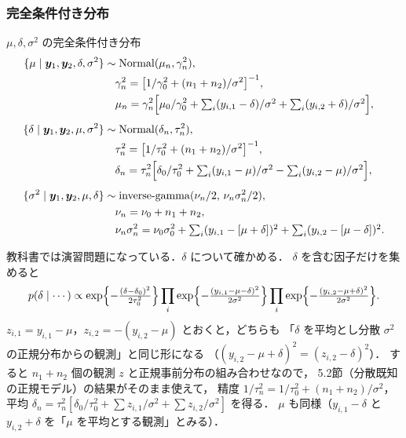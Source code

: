 \documentclass[lualatex,ja=standard,a4paper,12pt]{bxjsarticle}
\newcommand{\IG}{\mathrm{inverse\text{-}gamma}}
\begin{document}
\subsubsection*{完全条件付き分布}

\begin{thmbox}{$\mu, \delta, \sigma^2$ の完全条件付き分布}
\begin{align*}
  \{\mu \mid \bm{y}_1, \bm{y}_2, \delta, \sigma^2\} &\sim \mathrm{Normal}(\mu_n, \gamma_n^2), \\
  &\quad \gamma_n^2 = \bigl[1/\gamma_0^2 + (n_1+n_2)/\sigma^2\bigr]^{-1}, \\
  &\quad \mu_n = \gamma_n^2\Bigl[\mu_0/\gamma_0^2 + \textstyle\sum_i (y_{i,1} - \delta)/\sigma^2 + \sum_i (y_{i,2} + \delta)/\sigma^2\Bigr], \\[4pt]
  \{\delta \mid \bm{y}_1, \bm{y}_2, \mu, \sigma^2\} &\sim \mathrm{Normal}(\delta_n, \tau_n^2), \\
  &\quad \tau_n^2 = \bigl[1/\tau_0^2 + (n_1+n_2)/\sigma^2\bigr]^{-1}, \\
  &\quad \delta_n = \tau_n^2\Bigl[\delta_0/\tau_0^2 + \textstyle\sum_i (y_{i,1} - \mu)/\sigma^2 - \sum_i (y_{i,2} - \mu)/\sigma^2\Bigr], \\[4pt]
  \{\sigma^2 \mid \bm{y}_1, \bm{y}_2, \mu, \delta\} &\sim \IG(\nu_n/2,\, \nu_n\sigma_n^2/2), \\
  &\quad \nu_n = \nu_0 + n_1 + n_2, \\
  &\quad \nu_n\sigma_n^2 = \nu_0\sigma_0^2 + \textstyle\sum_i (y_{i,1} - [\mu + \delta])^2 + \sum_i (y_{i,2} - [\mu - \delta])^2.
\end{align*}
\end{thmbox}

\begin{derivbox}
教科書では演習問題になっている．$\delta$ について確かめる．
$\delta$ を含む因子だけを集めると
\[
  p(\delta \mid \cdots) \propto
  \exp\Bigl\{-\tfrac{(\delta - \delta_0)^2}{2\tau_0^2}\Bigr\}
  \prod_i \exp\Bigl\{-\tfrac{(y_{i,1} - \mu - \delta)^2}{2\sigma^2}\Bigr\}
  \prod_i \exp\Bigl\{-\tfrac{(y_{i,2} - \mu + \delta)^2}{2\sigma^2}\Bigr\}.
\]
$z_{i,1} = y_{i,1} - \mu$，$z_{i,2} = -(y_{i,2} - \mu)$ とおくと，どちらも
「$\delta$ を平均とし分散 $\sigma^2$ の正規分布からの観測」と同じ形になる
（$(y_{i,2} - \mu + \delta)^2 = (z_{i,2} - \delta)^2$）．
すると $n_1 + n_2$ 個の観測 $z$ と正規事前分布の組み合わせなので，
5.2節（分散既知の正規モデル）の結果がそのまま使えて，
精度 $1/\tau_n^2 = 1/\tau_0^2 + (n_1+n_2)/\sigma^2$，
平均 $\delta_n = \tau_n^2[\delta_0/\tau_0^2 + \sum z_{i,1}/\sigma^2 + \sum z_{i,2}/\sigma^2]$ を得る．
$\mu$ も同様（$y_{i,1} - \delta$ と $y_{i,2} + \delta$ を「$\mu$ を平均とする観測」とみる）．
\end{derivbox}
\end{document}
